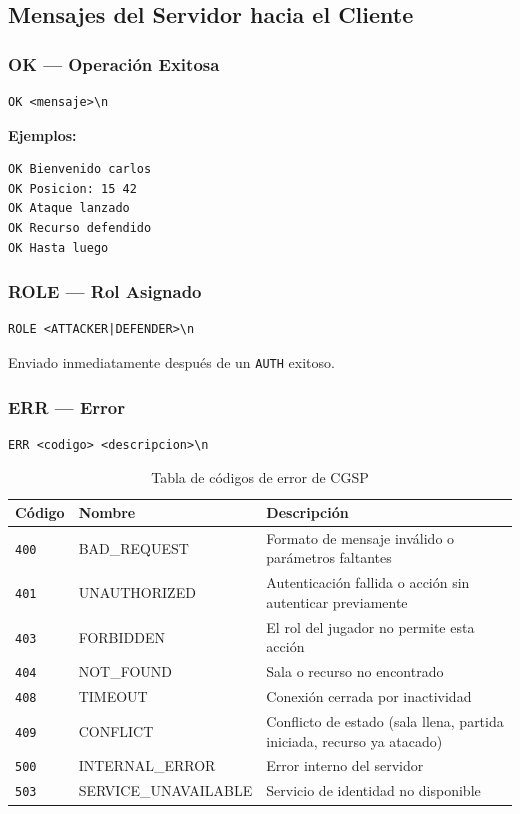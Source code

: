 \documentclass[12pt, letterpaper]{article}
\begin{document}
\subsection{Mensajes del Servidor hacia el Cliente}

\subsubsection{OK --- Operación Exitosa}

\begin{lstlisting}
OK <mensaje>\n
\end{lstlisting}

\textbf{Ejemplos:}
\begin{lstlisting}
OK Bienvenido carlos
OK Posicion: 15 42
OK Ataque lanzado
OK Recurso defendido
OK Hasta luego
\end{lstlisting}

\subsubsection{ROLE --- Rol Asignado}

\begin{lstlisting}
ROLE <ATTACKER|DEFENDER>\n
\end{lstlisting}

Enviado inmediatamente después de un \texttt{AUTH} exitoso.

\subsubsection{ERR --- Error}

\begin{lstlisting}
ERR <codigo> <descripcion>\n
\end{lstlisting}

\begin{table}[H]
\centering
\begin{tabularx}{\textwidth}{l l X}
\toprule
\textbf{Código} & \textbf{Nombre} & \textbf{Descripción} \\
\midrule
\texttt{400} & BAD\_REQUEST & Formato de mensaje inválido o parámetros faltantes \\
\texttt{401} & UNAUTHORIZED & Autenticación fallida o acción sin autenticar previamente \\
\texttt{403} & FORBIDDEN & El rol del jugador no permite esta acción \\
\texttt{404} & NOT\_FOUND & Sala o recurso no encontrado \\
\texttt{408} & TIMEOUT & Conexión cerrada por inactividad \\
\texttt{409} & CONFLICT & Conflicto de estado (sala llena, partida iniciada, recurso ya atacado) \\
\texttt{500} & INTERNAL\_ERROR & Error interno del servidor \\
\texttt{503} & SERVICE\_UNAVAILABLE & Servicio de identidad no disponible \\
\bottomrule
\end{tabularx}
\caption{Tabla de códigos de error de CGSP}
\end{table}
\end{document}
